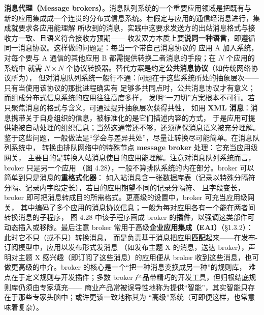 \medskip\noindent\textbf{消息代理（Message brokers）}。消息队列系统的一个重要应用领域是把既有与
新的应用集成成一个连贯的分布式信息系统。若假定与应用的通信经消息进行，集成就要求各应用能理解
所收到的消息，实践中这要求发送方的出站消息格式与接收方一致、且语义符合接收方预期——
收发双方本质上要\textbf{说同一种语言}，即遵循同一消息协议。这样做的问题是：每当一个带自己消息协议的
应用 A 加入系统，对每个要与 A 通信的其他应用 B 都需提供转换二者消息的手段；在 $N$ 个应用的系统中
就需 $N\times N$ 个协议转换器。替代方案是约定\textbf{公共消息协议}（如传统网络协议所为），
但对消息队列系统一般行不通：问题在于这些系统所处的抽象层次——只有当使用该协议的那批进程确实有
足够多共同点时，公共消息协议才有意义；而组成分布式信息系统的应用往往高度多样，
发明“一刀切”方案根本不可行。若只聚焦消息的格式与含义，可通过提升抽象层次获得共性，
如用 \textbf{XML 消息}：消息携带关于自身组织的信息，被标准化的是它们描述内容的方式，
于是应用可提供能被自动处理的组织信息；当然这通常还不够，还须确保消息语义被充分理解。
鉴于这些问题，一般做法是“学会与差异共处”，尽量让转换尽可能简单。在消息队列系统中，
转换由排队网络中的特殊节点 \textbf{message broker} 处理：它充当应用级网关，
主要目的是转换入站消息使目的应用能理解。注意对消息队列系统而言，broker 只是另一个应用
（图 4.28），一般不算排队系统的内在部分。broker 可以简单到只是消息的\textbf{重格式化器}：
如入站消息含一张数据库表（记录以特殊分隔符分隔、记录内字段定长），若目的应用期望不同的记录分隔符、
且字段变长，broker 即可把消息转成目的所需格式。更高级的设置中，broker 可充当应用级网关，
其中编码了多个应用的消息协议信息；一般为每对应用各有一个能在两者间转换消息的子程序，
图 4.28 中该子程序画成 broker 的\textbf{插件}，以强调这类部件可动态插入或移除。最后注意
broker 常用于高级\textbf{企业应用集成（EAI）}（§1.3.2）：此时它不只（或不只）转换消息，
而是负责基于消息把应用\textbf{匹配}起来——在发布-订阅模型中，应用以发布形式发消息
（如发布主题 X 的消息，送达 broker），声明对主题 X 感兴趣（即订阅了这些消息）的应用便从 broker
收到这些消息，也可做更高级的中介。broker 的核心是一个“把一种消息变换成另一种”的规则库，
难点在于定义规则与开发插件；多数 broker 产品带精巧的开发工具，但归根结底规则库仍须由专家填充——
商业产品常被误导性地称为提供“智能”，其实智能只存在于那些专家头脑中；或许更该一致地称其为
“高级”系统（可即便这样，也常意味着复杂）。

\begin{closeread}
\end{closeread}

